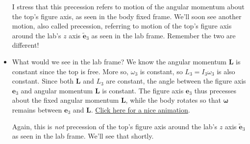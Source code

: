 \documentclass[11pt, a4paper]{article}
\newcommand{\e}{\bm{e}} %
\begin{document}
\begin{itemize}
	I stress that this precession refers to motion of the angular momentum about the top's figure axis, as seen in the body fixed frame. We'll soon see another motion, also called precession, referring to motion of the top's figure axis around the lab's $ z $ axis $ \tilde{\e}_{3} $ as seen in the lab frame. Remember the two are different!
	
	\item What would we see in the lab frame? We know the angular momentum $ \bm{L} $ is constant since the top is free. More so, $ \omega_{3} $ is constant, so $ L_{3} = I_{3} \omega_{3} $ is also constant. Since both $ \bm{L} $ and $ L_{3} $ are constant, the angle between the figure axis $ \e_{3} $ and angular momentum $ \bm{L} $ is constant. The figure axis $ \e_{3} $ thus precesses about the fixed angular momentum $ \bm{L} $, while the body rotates so that $ \bm{\omega} $ remains between $ \e_{3} $ and $ \bm{L} $. \href{https://www.youtube.com/watch?v=s9wiRjUKctU} {Click here for a nice animation}.
	
	Again, this is \textit{not} precession of the top's figure axis around the lab's $ z $ axis $ \tilde{\e}_{3} $ as seen in the lab frame. We'll see that shortly.
	
\end{itemize}
\end{document}
